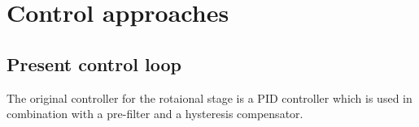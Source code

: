 \chapter{Control approaches}\label{cha:modelling}
\section{Present control loop}
The original controller for the rotaional stage is a PID controller which is used in combination with a pre-filter and a hysteresis compensator.
